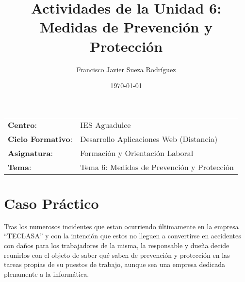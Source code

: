 


\title{
\vspace{10ex}
\normalfont \normalsize
\huge \textbf{Actividades de la Unidad 6: Medidas de Prevención y Protección}
}
\author{Francisco Javier Sueza Rodríguez}
\date{\normalsize\today}



\maketitle

\thispagestyle{empty}

\vspace{65ex}

\begin{center}
    \begin{tabular}{l l}
        \textbf{Centro}: & IES Aguadulce \\
        \textbf{Ciclo Formativo}: & Desarrollo Aplicaciones Web (Distancia)\\
        \textbf{Asignatura}: & Formación y Orientación Laboral\\
        \textbf{Tema}: & Tema 6: Medidas de Prevención y Protección\\
    \end{tabular}
\end{center}

\newpage

\tableofcontents

\newpage
\section{Caso Práctico}


Tras los numerosos incidentes  que estan ocurriendo últimamente en la empresa ``TECLASA'' y con la intención que estos no lleguen a convertirse en accidentes con daños para los trabajadores de la misma, la responsable y dueña decide reunirlos con el objeto de saber qué saben de prevención y protección en las tareas propias de su puestos de trabajo, aunque sea una empresa dedicada plenamente a la informática.

